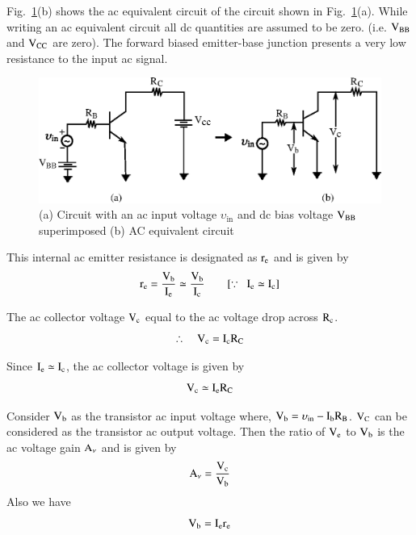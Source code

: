 Fig.~\ref{fig2.9}(b) shows the ac equivalent circuit of the circuit shown in Fig.~\ref{fig2.9}(a). While writing an ac equivalent circuit all dc quantities are assumed to be zero. (i.e. $\textrm{V}_{\text{BB}}$ and $\textrm{V}_{\text{CC}}$ are zero). The forward biased emitter-base junction presents a very low resistance to the input ac signal.
\begin{figure}[H]
\centering
\includegraphics{chap2/fig9.eps}
\caption{(a) Circuit with an ac input voltage $\upsilon_{\text{in}}$ and dc bias voltage $\textrm{V}_{\textrm{B}\textrm{B}}$ superimposed (b) AC equivalent circuit}\label{fig2.9}
\end{figure}

This internal ac emitter resistance is designated as $\textrm{r}_{\textrm{e}}$ and is given by 
\begin{equation}
\textrm{r}_{\textrm{e}} = \frac{\textrm{V}_{\textrm{b}}}{\textrm{I}_{\textrm{e}}}\simeq \frac{\textrm{V}_{\textrm{b}}}{\textrm{I}_{\textrm{c}}}\qquad [\because ~~ \textrm{I}_{\textrm{e}}\simeq \textrm{I}_{\textrm{c}}]\label{eq2.20}
\end{equation}

The ac collector voltage $\textrm{V}_{\textrm{c}}$ equal to the ac voltage drop across $\textrm{R}_{\textrm{c}}$.
\begin{equation}
\therefore\quad \textrm{V}_{\textrm{c}} = \textrm{I}_{\textrm{c}}\textrm{R}_{\textrm{C}}\label{eq2.21}
\end{equation}

Since $\textrm{I}_{\textrm{e}}\simeq \textrm{I}_{\textrm{c}}$, the ac collector voltage is given by
\begin{equation}
\textrm{V}_{\textrm{c}}\simeq \textrm{I}_{\textrm{e}}\textrm{R}_{\textrm{C}}\label{eq2.22}
\end{equation}

Consider $\textrm{V}_{\textrm{b}}$ as the transistor ac input voltage where, $\textrm{V}_{\textrm{b}}=\upsilon_{\text{in}}-\textrm{I}_{\textrm{b}}\textrm{R}_{\textrm{B}}$. $\textrm{V}_{\textrm{C}}$ can be considered as the transistor ac output voltage. Then the ratio of $\textrm{V}_{\textrm{e}}$ to $\textrm{V}_{\textrm{b}}$ is the ac voltage gain $\textrm{A}_{\nu}$ and is given by
\begin{equation}
\textrm{A}_{\nu}=\frac{\textrm{V}_{\textrm{c}}}{\textrm{V}_{\textrm{b}}}\label{eq2.23}
\end{equation}
Also we have
\begin{equation}
\textrm{V}_{\textrm{b}}=\textrm{I}_{\textrm{e}}\textrm{r}_{\textrm{e}}\label{eq2.24}
\end{equation}

